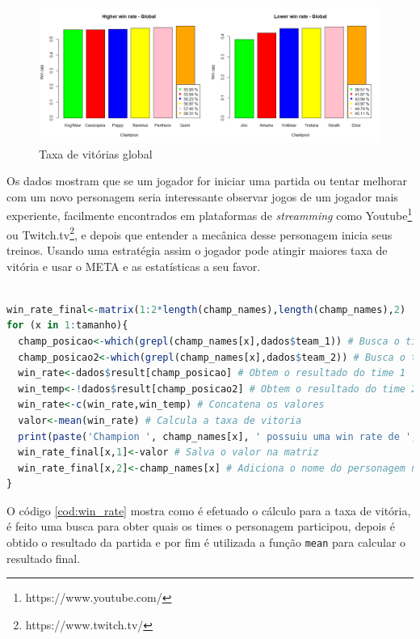 \documentclass[a4paper]{article}
\begin{document}
\begin{figure}[ht]
\centering
\includegraphics[width=1\columnwidth]{imagens/Rplot}
\caption{\label{fig:win_rate}Taxa de vitórias global}
\end{figure}

Os dados mostram que se um jogador for iniciar uma partida ou tentar melhorar com um novo personagem seria interessante observar jogos de um jogador mais experiente, facilmente encontrados em plataformas de \textit{streamming} como Youtube\footnote{https://www.youtube.com/} ou Twitch.tv\footnote{https://www.twitch.tv/}, e depois que entender a mecânica desse personagem inicia seus treinos. Usando uma estratégia assim o jogador pode atingir maiores taxa de vitória e usar o META e as estatísticas a seu favor.

\begin{lstlisting}[language=R, caption={Calculo da taxa de vitória},label={cod:win_rate}]

win_rate_final<-matrix(1:2*length(champ_names),length(champ_names),2)
for (x in 1:tamanho){
  champ_posicao<-which(grepl(champ_names[x],dados$team_1)) # Busca o time 1 que um persangem participou
  champ_posicao2<-which(grepl(champ_names[x],dados$team_2)) # Busca o time 2 que um persangem participou
  win_rate<-dados$result[champ_posicao] # Obtem o resultado do time 1
  win_temp<-!dados$result[champ_posicao2] # Obtem o resultado do time 2 (invertido)
  win_rate<-c(win_rate,win_temp) # Concatena os valores
  valor<-mean(win_rate) # Calcula a taxa de vitoria
  print(paste('Champion ', champ_names[x], ' possuiu uma win rate de ', valor, '!')) # Exibe o valor do resultado como o nome do personagem
  win_rate_final[x,1]<-valor # Salva o valor na matriz
  win_rate_final[x,2]<-champ_names[x] # Adiciona o nome do personagem na matriz
}

\end{lstlisting}

O código \ref{cod:win_rate} mostra como é efetuado o cálculo para a taxa de vitória, é feito uma busca para obter quais os times o personagem participou, depois é obtido o resultado da partida e por fim é utilizada a função \texttt{mean} para calcular o resultado final.
\end{document}

